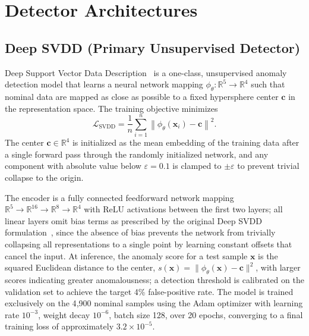 \documentclass[12pt, a4paper]{report}
\begin{document}
\chapter{Detector Architectures}\label{ch:detectors}

\section{Deep SVDD (Primary Unsupervised Detector)}\label{sec:deep_svdd}
Deep Support Vector Data Description~\cite{ruff2018deep} is a one-class, unsupervised anomaly detection model that learns a neural network mapping $\phi_\theta: \mathbb{R}^5 \to \mathbb{R}^4$ such that nominal data are mapped as close as possible to a fixed hypersphere center $\mathbf{c}$ in the representation space. The training objective minimizes
\begin{equation}
    \mathcal{L}_{\text{SVDD}} = \frac{1}{n} \sum_{i=1}^{n} \left\| \phi_\theta(\mathbf{x}_i) - \mathbf{c} \right\|^2.
\end{equation}
The center $\mathbf{c} \in \mathbb{R}^4$ is initialized as the mean embedding of the training data after a single forward pass through the randomly initialized network, and any component with absolute value below $\varepsilon = 0.1$ is clamped to $\pm\varepsilon$ to prevent trivial collapse to the origin.

The encoder is a fully connected feedforward network mapping $\mathbb{R}^5 \to \mathbb{R}^{16} \to \mathbb{R}^{8} \to \mathbb{R}^{4}$ with ReLU activations between the first two layers; all linear layers omit bias terms as prescribed by the original Deep SVDD formulation~\cite{ruff2018deep}, since the absence of bias prevents the network from trivially collapsing all representations to a single point by learning constant offsets that cancel the input. At inference, the anomaly score for a test sample $\mathbf{x}$ is the squared Euclidean distance to the center, $s(\mathbf{x}) = \| \phi_\theta(\mathbf{x}) - \mathbf{c} \|^2$, with larger scores indicating greater anomalousness; a detection threshold is calibrated on the validation set to achieve the target 4\% false-positive rate. The model is trained exclusively on the 4{,}900 nominal samples using the Adam optimizer with learning rate $10^{-3}$, weight decay $10^{-6}$, batch size 128, over 20 epochs, converging to a final training loss of approximately $3.2 \times 10^{-5}$.
\end{document}
